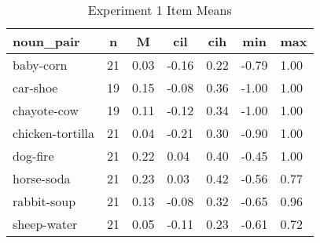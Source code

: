 


\begin{table}[tbp]

\begin{center}
\begin{threeparttable}

\caption{\label{tab:r2-cn-by-item-table-si}Experiment 1 Item Means}

\begin{tabular}{lllllll}
\toprule
noun\_pair & \multicolumn{1}{c}{n} & \multicolumn{1}{c}{M} & \multicolumn{1}{c}{cil} & \multicolumn{1}{c}{cih} & \multicolumn{1}{c}{min} & \multicolumn{1}{c}{max}\\
\midrule
baby-corn & 21 & 0.03 & -0.16 & 0.22 & -0.79 & 1.00\\
car-shoe & 19 & 0.15 & -0.08 & 0.36 & -1.00 & 1.00\\
chayote-cow & 19 & 0.11 & -0.12 & 0.34 & -1.00 & 1.00\\
chicken-tortilla & 21 & 0.04 & -0.21 & 0.30 & -0.90 & 1.00\\
dog-fire & 21 & 0.22 & 0.04 & 0.40 & -0.45 & 1.00\\
horse-soda & 21 & 0.23 & 0.03 & 0.42 & -0.56 & 0.77\\
rabbit-soup & 21 & 0.13 & -0.08 & 0.32 & -0.65 & 0.96\\
sheep-water & 21 & 0.05 & -0.11 & 0.23 & -0.61 & 0.72\\
\bottomrule
\end{tabular}

\end{threeparttable}
\end{center}

\end{table}



